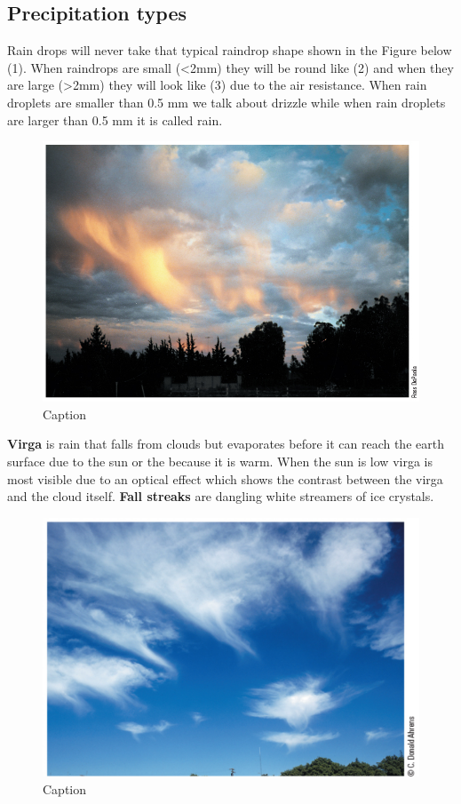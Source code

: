 \documentclass[12pt,oneside]{book}
\begin{document}
\subsection{Precipitation types}\label{precipitation-types}

Rain drops will never take that typical raindrop shape shown in the
Figure below (1). When raindrops are small (\textless{}2mm) they will be
round like (2) and when they are large (\textgreater{}2mm) they will
look like (3) due to the air resistance. When rain droplets are smaller
than 0.5 mm we talk about drizzle while when rain droplets are larger
than 0.5 mm it is called rain.

\begin{figure}

{\centering \includegraphics[width=0.9\linewidth]{figures/Figure336} 

}

\caption{Caption}\label{fig:RainDrop}
\end{figure}

\textbf{Virga} is rain that falls from clouds but evaporates before it
can reach the earth surface due to the sun or the because it is warm.
When the sun is low virga is most visible due to an optical effect which
shows the contrast between the virga and the cloud itself. \textbf{Fall
streaks} are dangling white streamers of ice crystals.

\begin{figure}

{\centering \includegraphics[width=0.9\linewidth]{figures/Figure337} 

}

\caption{Caption}\label{fig:Virga}
\end{figure}
\end{document}
